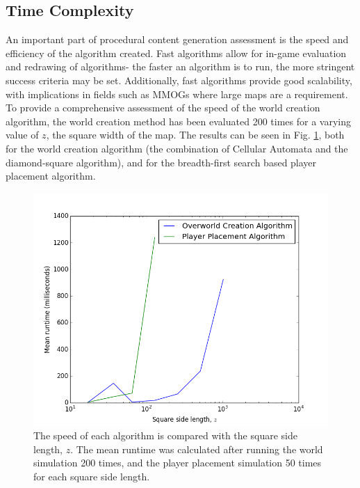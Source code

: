 \documentclass[12pt,a4paper]{article}
\begin{document}
\subsection{Time Complexity}

An important part of procedural content generation assessment is the speed and efficiency of the algorithm created. Fast algorithms allow for in-game evaluation and redrawing of algorithms- the faster an algorithm is to run, the more stringent success criteria may be set. Additionally, fast algorithms provide good scalability, with implications in fields such as MMOGs where large maps are a requirement. To provide a comprehensive assessment of the speed of the world creation algorithm, the world creation method has been evaluated 200 times for a varying value of $z$, the square width of the map. The results can be seen in Fig. \ref{fig:9}, both for the world creation algorithm (the combination of Cellular Automata and the diamond-square algorithm), and for the breadth-first search based player placement algorithm.  


\begin{figure}
  \centering
 	\includegraphics[width=0.5\linewidth]{images/speedtest.png}
	\caption[]{The speed of each algorithm is compared with the square side length, $z$. The mean runtime was calculated after running the world simulation 200 times, and the player placement simulation 50 times for each square side length.}
	\label{fig:9}
\end{figure} 
\end{document}
